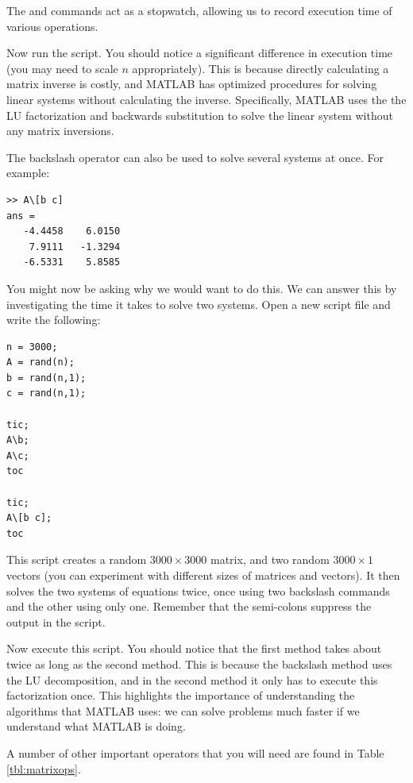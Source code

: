 

The  and  commands act as a stopwatch, allowing us to record execution time of various operations.

Now run the script. You should notice a significant difference in execution time (you may need to scale $n$ appropriately). This is because directly calculating a matrix inverse is costly, and MATLAB has optimized procedures for solving linear systems without calculating the inverse. Specifically, MATLAB uses the the LU factorization and backwards substitution to solve the linear system without any matrix inversions.

The backslash operator can also be used to solve several systems at once. For example:

\begin{lstlisting}[style=matlab]
>> A\[b c]
ans =
   -4.4458    6.0150
    7.9111   -1.3294
   -6.5331    5.8585
\end{lstlisting}

You might now be asking why we would want to do this. We can answer this by investigating the time it takes to solve two systems. Open a new script file and write the following:

\begin{lstlisting}[style=matlab]
n = 3000;
A = rand(n);
b = rand(n,1);
c = rand(n,1);

tic;
A\b;
A\c;
toc

tic;
A\[b c];
toc
\end{lstlisting}

This script creates a random $3000 \times 3000$ matrix, and two random $3000 \times 1$ vectors (you can experiment with different sizes of matrices and vectors). It then solves the two systems of equations twice, once using two backslash commands and the other using only one. Remember that the semi-colons suppress the output in the script.

Now execute this script. You should notice that the first method takes about twice as long as the second method. This is because the backslash method uses the LU decomposition, and in the second method it only has to execute this factorization once. This highlights the importance of understanding the algorithms that MATLAB uses: we can solve problems much faster if we understand what MATLAB is doing.

A number of other important operators that you will need are found in Table \ref{tbl:matrixops}.


